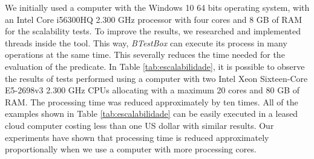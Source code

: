 \documentclass[runningheads]{llncs}
\begin{document}
We initially used a computer with the Windows 10 64 bits operating system, with an Intel Core i56300HQ 2.300 GHz processor with four cores and 8 GB of RAM for the scalability tests. %
%
To improve the results, we researched and implemented threads inside the tool.
This way, \textit{BTestBox} can execute its process in many operations at the same time.
This severally reduces the time needed for the evaluation of the predicate. In Table \ref{tab:escalabilidade}, it is possible to observe the results of tests performed using a computer with two Intel Xeon Sixteen-Core E5-2698v3 2.300 GHz CPUs allocating with a maximum 20 cores and 80 GB of RAM. 
The processing time was reduced approximately by ten times.
All of the examples shown in Table \ref{tab:escalabilidade} can be easily executed in a leased cloud computer costing less than one US dollar with similar results.
Our experiments have shown that processing time is reduced approximately proportionally when we use a computer with more processing cores.


\end{document}
